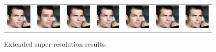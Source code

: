 \begin{figure}
\begin{center}
\begin{tabular}{ccccccc}
        \includegraphics[width=.14\textwidth]{Chapter2/samples/extended_results/super_resolution/805/x.png} &   
        \includegraphics[width=.14\textwidth]{Chapter2/samples/extended_results/super_resolution/805/y.png} &
        \includegraphics[width=.14\textwidth]{Chapter2/samples/extended_results/super_resolution/805/HCFLOW.png} &
        \includegraphics[width=.14\textwidth]{Chapter2/samples/extended_results/super_resolution/805/CDE.png} & 
        \includegraphics[width=.14\textwidth]{Chapter2/samples/extended_results/super_resolution/805/CDiffE.png} &
        \includegraphics[width=.14\textwidth]{Chapter2/samples/extended_results/super_resolution/805/cmde.png} &
        \includegraphics[width=.14\textwidth]{Chapter2/samples/extended_results/super_resolution/805/VS-CMDE.png}\\

    \end{tabular}
    \endgroup
    \end{center}
    \caption{Extended super-resolution results.}
    \label{ch2:fig:additional_sr}
\end{figure}

